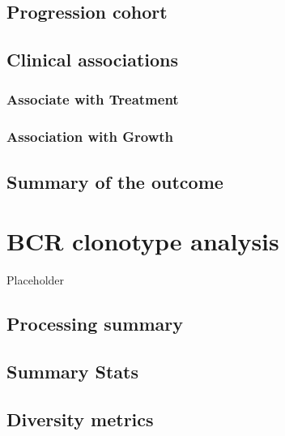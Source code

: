 \documentclass[
]{book}
\begin{document}
\hypertarget{progression-cohort-1}{%
\section{Progression cohort}\label{progression-cohort-1}}

\hypertarget{clinical-associations}{%
\section{Clinical associations}\label{clinical-associations}}

\hypertarget{associate-with-treatment}{%
\subsection{Associate with Treatment}\label{associate-with-treatment}}

\hypertarget{association-with-growth}{%
\subsection{Association with Growth}\label{association-with-growth}}

\hypertarget{summary-of-the-outcome}{%
\section{Summary of the outcome}\label{summary-of-the-outcome}}

\hypertarget{bcr-clonotype-analysis}{%
\chapter{BCR clonotype analysis}\label{bcr-clonotype-analysis}}

Placeholder

\hypertarget{processing-summary}{%
\section{Processing summary}\label{processing-summary}}

\hypertarget{summary-stats}{%
\section{Summary Stats}\label{summary-stats}}

\hypertarget{diversity-metrics}{%
\section{Diversity metrics}\label{diversity-metrics}}
\end{document}
